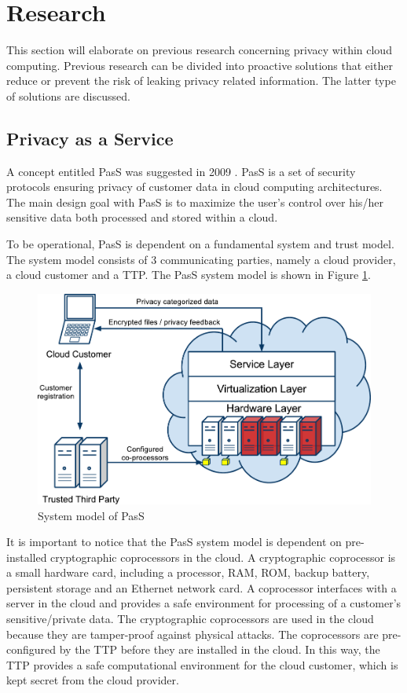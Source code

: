 \documentclass[pdftex,english,10pt,b5paper,twoside]{book}
\begin{document}
\section{Research}
This section will elaborate on previous research concerning privacy within cloud
computing. Previous research can be divided into proactive solutions that
either reduce or prevent the risk of leaking privacy related information. The
latter type of solutions are discussed.

\subsection{Privacy as a Service}
A concept entitled \ac{PasS} was suggested in 2009
\cite{PasS}. PasS is a set of security protocols ensuring privacy of customer
data in cloud computing architectures. The main design goal with PasS is to
maximize the user's control over his/her sensitive data both processed and stored
within a cloud.

To be operational, PasS is dependent on a fundamental system and trust model. The
system model consists of 3 communicating parties, namely a cloud provider, a
cloud customer and a \ac{TTP}. The PasS system model is shown
in Figure \ref{fig:RW:PasS}. 
\begin{figure}[h!]
    \centering
    \includegraphics[scale=0.6]{ArchitecturePasS.pdf}
    \caption{System model of PasS}
    \label{fig:RW:PasS}
\end{figure}
It is important to notice that the PasS system model is dependent on
pre-installed cryptographic coprocessors in the cloud. A cryptographic
coprocessor is a small hardware card, including a processor, RAM, ROM, backup
battery, persistent storage and an Ethernet network card. A coprocessor interfaces
with a server in the cloud and provides a safe environment for processing of
a customer's sensitive/private data. The cryptographic coprocessors are used in the
cloud because they are tamper-proof against physical attacks. The coprocessors
are pre-configured by the TTP before they are installed in the cloud. In this
way, the TTP provides a safe computational environment for the cloud customer,
which is kept secret from the cloud provider.
\end{document}
